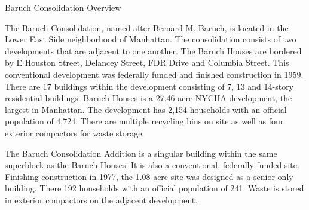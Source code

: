 Baruch Consolidation Overview

The Baruch Consolidation, named after Bernard M. Baruch, is located in the Lower East Side neighborhood of Manhattan. The consolidation consists of two developments that are adjacent to one another. The Baruch Houses are bordered by E Houston Street, Delancey Street, FDR Drive and Columbia Street. This conventional development was federally funded and finished construction in 1959. There are 17 buildings within the development consisting of 7, 13 and 14-story residential buildings. Baruch Houses is a 27.46-acre NYCHA development, the largest in Manhattan. The development has 2,154 households with an official population of 4,724. There are multiple recycling bins on site as well as four exterior compactors for waste storage.

The Baruch Consolidation Addition is a singular building within the same superblock as the Baruch Houses. It is also a conventional, federally funded site. Finishing construction in 1977, the 1.08 acre site was designed as a senior only building. There 192 households with an official population of 241. Waste is stored in exterior compactors on the adjacent development.